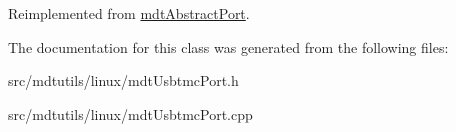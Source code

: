 Reimplemented from \hyperlink{classmdt_abstract_port_a2235d62d9a9e4555d41773c41cc3bc70}{mdtAbstractPort}.



The documentation for this class was generated from the following files:\begin{DoxyCompactItemize}
\item 
src/mdtutils/linux/mdtUsbtmcPort.h\item 
src/mdtutils/linux/mdtUsbtmcPort.cpp\end{DoxyCompactItemize}
